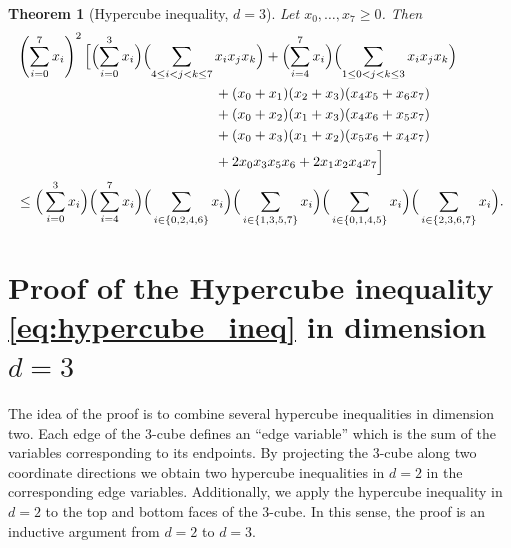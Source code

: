 \documentclass[11pt]{amsart}
\newtheorem{thm}{Theorem}[section]
\theoremstyle{definition}
\theoremstyle{remark}
\begin{document}


\begin{thm}[Hypercube inequality, $d=3$]\label{thm:HI3}
Let $x_0,\dots,x_7 \ge 0$. Then
\begin{align}\label{eq:HI_d=3}
&\left(\sum_{i=0}^{7} x_i\right)^2 
\Big[
    \Bigl(\sum_{i=0}^{3} x_i\Bigr)\Bigl(\sum_{4\le i<j<k\le 7} x_i x_j x_k\Bigr)+
    \Bigl(\sum_{i=4}^{7} x_i\Bigr)\Bigl(\sum_{1\le 0<j<k\le 3} x_i x_j x_k\Bigr)
\notag \\
&\hspace{5cm} + (x_0+x_1)(x_2+x_3)(x_4x_5+x_6x_7) \notag \\
&\hspace{5cm}  + (x_0+x_2)(x_1+x_3)(x_4x_6+x_5x_7) \notag \\
&\hspace{5cm}  + (x_0+x_3)(x_1+x_2)(x_5x_6+x_4x_7) \notag \\
&\hspace{5cm}  + 2x_0x_3x_5x_6 + 2x_1x_2x_4x_7
\Big]\notag \\
&\hspace{.0cm} \leq 
\Big(\sum_{i=0}^{3} x_i\Big)
\Big(\sum_{i=4}^{7} x_i\Big)
\Big(\sum_{i \in \{0,2,4,6\}} x_i\Big) 
\Big(\sum_{i \in \{1,3,5,7\}} x_i\Big) 
\Big(\sum_{i \in \{0,1,4,5\}} x_i\Big) 
\Big(\sum_{i \in \{2,3,6,7\}} x_i\Big). 
\end{align}
\end{thm}







\section{Proof of the Hypercube inequality \eqref{eq:hypercube_ineq} in dimension $d=3$}\label{sec:proof_HI}

The idea of the proof is to combine several hypercube inequalities in dimension two. 
Each edge of the 3-cube defines an ``edge variable'' which is the sum of the variables
corresponding to its endpoints. By projecting the 3-cube along two coordinate directions we obtain two hypercube inequalities in $d=2$ in the corresponding edge variables.
Additionally, we apply the hypercube inequality in $d=2$ to the top and bottom faces of the $3$-cube. In this sense, the proof is an inductive argument from $d=2$ to $d=3$.
\end{document}

